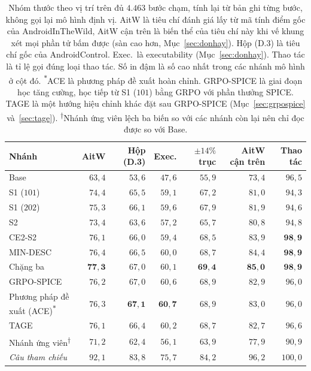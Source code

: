 \begin{table}[t]
\caption{Nhóm thước theo vị trí trên đủ $4.463$ bước chạm, tính lại từ bản ghi từng bước, không gọi lại mô hình định vị. AitW là tiêu chí đánh giá lấy từ mã tính điểm gốc của AndroidInTheWild, AitW cận trên là biến thể của tiêu chí này khi vế khung xét mọi phần tử bấm được (sàn cao hơn, Mục~\ref{sec:donhay}). Hộp (D.3) là tiêu chí gốc của AndroidControl. Exec.\ là executability (Mục~\ref{sec:donhay}). Thao tác là tỉ lệ gọi đúng loại thao tác. Số in đậm là số cao nhất trong các nhánh mô hình ở cột đó. \textsuperscript{$\ast$}ACE là phương pháp đề xuất hoàn chỉnh. GRPO-SPICE là giai đoạn học tăng cường, học tiếp từ S1 ($101$) bằng GRPO với phần thưởng SPICE. TAGE là một hướng hiệu chỉnh khác đặt sau GRPO-SPICE (Mục~\ref{sec:grpospice} và~\ref{sec:tage}). \textsuperscript{$\dagger$}Nhánh ứng viên lệch ba biến so với các nhánh còn lại nên chỉ đọc được so với Base.}
\label{tab:nhieuthuoc_vitri}
\centering\small
\renewcommand{\arraystretch}{1.2}
\setlength{\tabcolsep}{3.5pt}
\begin{tabular}{@{}lrrrrrr@{}}
\toprule
Nhánh & AitW & Hộp (D.3) & Exec. & $\pm 14\%$ trục & AitW cận trên & Thao tác \\
\midrule
Base & $63{,}4$ & $53{,}6$ & $47{,}6$ & $55{,}9$ & $73{,}4$ & $96{,}5$ \\
S1 ($101$) & $74{,}4$ & $65{,}5$ & $59{,}1$ & $67{,}2$ & $81{,}0$ & $94{,}3$ \\
S1 ($202$) & $75{,}3$ & $66{,}1$ & $59{,}6$ & $67{,}9$ & $81{,}9$ & $94{,}6$ \\
S2 & $73{,}4$ & $63{,}6$ & $57{,}2$ & $65{,}7$ & $80{,}8$ & $94{,}8$ \\
CE2-S2 & $76{,}1$ & $66{,}0$ & $59{,}4$ & $68{,}5$ & $83{,}9$ & $\mathbf{98{,}9}$ \\
MIN-DESC & $76{,}4$ & $66{,}5$ & $60{,}0$ & $68{,}7$ & $84{,}4$ & $\mathbf{98{,}9}$ \\
Chặng ba & $\mathbf{77{,}3}$ & $67{,}0$ & $60{,}1$ & $\mathbf{69{,}4}$ & $\mathbf{85{,}0}$ & $\mathbf{98{,}9}$ \\
GRPO-SPICE & $76{,}2$ & $67{,}0$ & $60{,}6$ & $68{,}9$ & $82{,}9$ & $96{,}0$ \\
Phương pháp đề xuất (ACE)\textsuperscript{$\ast$} & $76{,}3$ & $\mathbf{67{,}1}$ & $\mathbf{60{,}7}$ & $68{,}9$ & $83{,}0$ & $96{,}0$ \\
TAGE & $76{,}1$ & $66{,}4$ & $60{,}2$ & $68{,}7$ & $82{,}7$ & $96{,}6$ \\
Nhánh ứng viên\textsuperscript{$\dagger$} & $71{,}2$ & $62{,}4$ & $56{,}1$ & $63{,}9$ & $77{,}9$ & $90{,}9$ \\
\midrule
\emph{Câu tham chiếu} & $92{,}1$ & $83{,}8$ & $75{,}7$ & $84{,}2$ & $96{,}2$ & $100{,}0$ \\
\bottomrule
\end{tabular}
\end{table}

